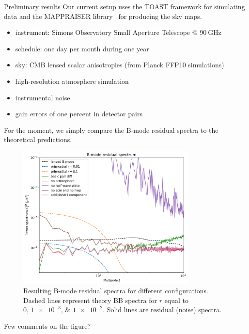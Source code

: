 \documentclass[final]{beamer}
\newlength{\colwidth}
\begin{document}
\begin{frame}[t]
\begin{columns}[t]
\begin{column}{\colwidth}
\begin{block}{Preliminary results}
        Our current setup uses the TOAST framework for simulating data and the MAPPRAISER library~\cite{ElBouhargani:2021umq} for producing the sky maps.

        \begin{itemize}
          \item instrument: Simons Observatory Small Aperture Telescope @ $\qty[mode=text]{90}{\giga\hertz}$
          \item schedule: one day per month during one year
          \item sky: CMB lensed scalar anisotropies (from Planck FFP10 simulations)
          \item high-resolution atmosphere simulation
          \item instrumental noise
          \item gain errors of one percent in detector pairs
        \end{itemize}

        For the moment, we simply compare the B-mode residual spectra to the theoretical predictions.

        \begin{figure}
          \centering
          \includegraphics[width=0.8\textwidth]{figures/comparison.png}
          \caption{Resulting B-mode residual spectra for different configurations. Dashed lines represent theory BB spectra for $r$ equal to $\numlist[mode=text]{0;1e-3;1e-2}$. Solid lines are residual (noise) spectra.}
        \end{figure}

        Few comments on the figure?

      \end{block}


\end{column}
\end{columns}
\end{frame}
\end{document}
